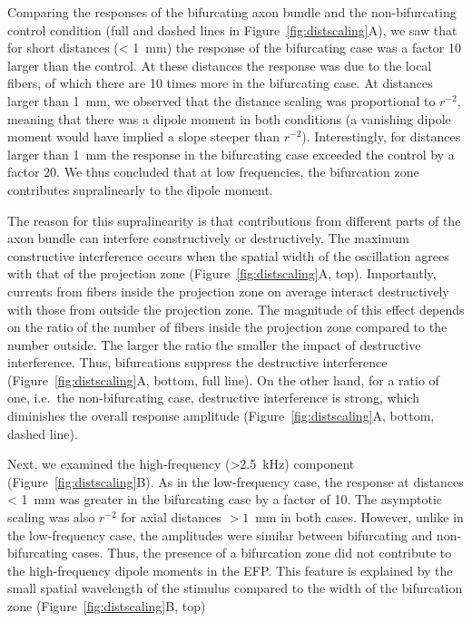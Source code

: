 \documentclass[]{elife}
\begin{document}
Comparing the responses of the bifurcating axon bundle and the
non-bifurcating control condition (full and dashed lines in
Figure~\ref{fig:distscaling}A), we saw that for short distances
(\textless{} 1~mm) the response of the bifurcating case was a factor 10
larger than the control. At these distances the response was due to the
local fibers, of which there are 10 times more in the bifurcating case.
At distances larger than 1~mm, we observed that the distance scaling was
proportional to \(r^{-2}\), meaning that there was a dipole moment in
both conditions (a vanishing dipole moment would have implied a slope
steeper than \(r^{-2}\)). Interestingly, for distances larger than 1~mm
the response in the bifurcating case exceeded the control by a factor
20. We thus concluded that at low frequencies, the bifurcation zone
contributes supralinearly to the dipole moment.

The reason for this supralinearity is that contributions from different
parts of the axon bundle can interfere constructively or destructively.
The maximum constructive interference occurs when the spatial width of
the oscillation agrees with that of the projection zone
(Figure~\ref{fig:distscaling}A, top). Importantly, currents from fibers
inside the projection zone on average interact destructively with those
from outside the projection zone. The magnitude of this effect depends
on the ratio of the number of fibers inside the projection zone compared
to the number outside. The larger the ratio the smaller the impact of
destructive interference. Thus, bifurcations suppress the destructive
interference (Figure~\ref{fig:distscaling}A, bottom, full line). On the
other hand, for a ratio of one, i.e.~the non-bifurcating case,
destructive interference is strong, which diminishes the overall
response amplitude (Figure~\ref{fig:distscaling}A, bottom, dashed line).

Next, we examined the high-frequency (\textgreater{}2.5~kHz) component
(Figure~\ref{fig:distscaling}B). As in the low-frequency case, the
response at distances \textless{} 1~mm was greater in the bifurcating
case by a factor of 10. The asymptotic scaling was also \(r^{-2}\) for
axial distances \(> 1\)~mm in both cases. However, unlike in the
low-frequency case, the amplitudes were similar between bifurcating and
non-bifurcating cases. Thus, the presence of a bifurcation zone did not
contribute to the high-frequency dipole moments in the EFP. This feature
is explained by the small spatial wavelength of the stimulus compared to
the width of the bifurcation zone (Figure~\ref{fig:distscaling}B, top)
\end{document}
